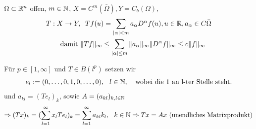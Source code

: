 \begin{beispiel}[Differentialoperatoren] 
$\Omega \subset \mathbb{R}^n$ offen, $m \in \mathbb{N}$, $X = C^{m}(\bar \Omega), Y = C_{b}(\Omega),$
\begin{align*}
T:X \rightarrow Y, & \hspace{0.25cm} Tf(u) = \sum_{|\alpha| < m} a_{\alpha} D^{\alpha} f(u), u \in \mathbb{R}, a_{\alpha} \in C{\bar \Omega} \\
  \text{damit } & \| Tf \|_{\infty} \leq \sum_{|\alpha| \leq m} \| a_{\alpha} \|_{\infty} \| D^{\alpha} f \|_{\infty} \leq c \|f\|_{\infty}
 \end{align*}
\end{beispiel}

\begin{beispiel}[Matrizenmultiplikation] 
Für $p \in [1, \infty]$ und $T \in B(l^{p})$ setzen wir 
\[ e_{l} := (0, \dotsc, 0, 1, 0, \dotsc, 0), \hspace{0.25cm} l \in \mathbb{N}, \hspace{0.25cm} \text{ wobei die 1 an l-ter Stelle steht.} \]
und $a_{kl} = (T e_{l})_{k}$, sowie $A = (a_{kl})_{k,l \in \mathbb{N}}$
\[
	\Rightarrow (Tx)_{k} = (\sum_{l = 1}^{\infty} x_{l} T e_{l})_{k} = \sum_{ l = 1}^{\infty} a_{kl}k_{l}, \hspace{0.25cm} k \in \mathbb{N} \\
	\Rightarrow T x = A x \text{ (unendliches Matrixprodukt)}
\]


\end{beispiel}

